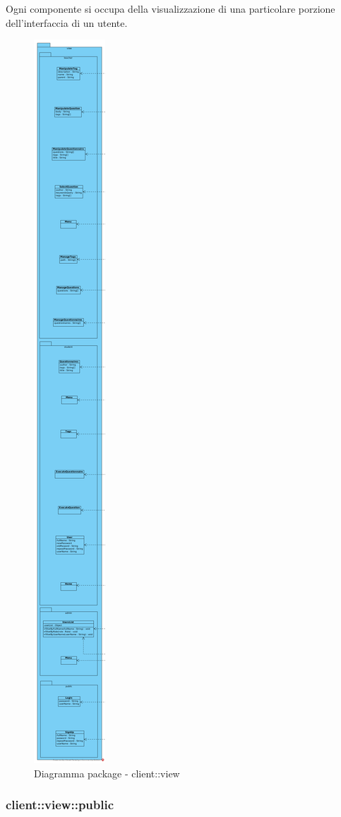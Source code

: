 Ogni componente si occupa della visualizzazione di una particolare porzione dell'interfaccia di un utente.\begin{center}
	\begin{figure}[H]
		\centering \includegraphics[scale=4, max width=\textwidth, max height=\myheight]{../img/diagrammiClassi/client/view.png}
		\caption{Diagramma package - client::view}
	\end{figure}
\end{center}\subsubsection{client::view::public}
